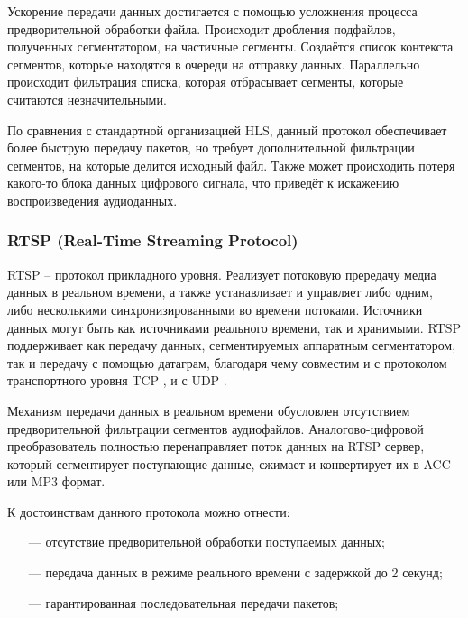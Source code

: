 		\par Ускорение передачи данных достигается с помощью усложнения процесса предворительной обработки файла. 
		Происходит дробления подфайлов, полученных сегментатором, на частичные сегменты. 
		Создаётся список контекста сегментов, которые находятся в очереди на отправку данных.
		Параллельно происходит фильтрация списка, которая отбрасывает сегменты, которые считаются незначительными.

		\par По сравнения с стандартной организацией HLS, данный протокол обеспечивает более быструю передачу пакетов, 
		но требует дополнительной фильтрации сегментов, на которые делится исходный файл. 
		Также может происходить потеря какого-то блока данных цифрового сигнала, что приведёт к искажению воспроизведения аудиоданных.


	\subsubsection{RTSP (Real-Time Streaming Protocol)}

		\par RTSP \cite{rtsp} – протокол прикладного уровня. 
		Реализует потоковую прередачу медиа данных в реальном времени, а также устанавливает и управляет либо одним, либо несколькими синхронизированными во времени потоками.
		Источники данных могут быть как источниками реального времени, так и хранимыми.
		RTSP поддерживает как передачу данных, сегментируемых аппаратным сегментатором, так и передачу с помощью датаграм, благодаря чему совместим и с протоколом транспортного уровня TCP \cite{tcp}, и с UDP \cite{udp}.

		\par Механизм передачи данных в реальном времени обусловлен отсутствием предворительной фильтрации сегментов аудиофайлов. 
		Аналогово-цифровой преобразователь полностью перенаправляет поток данных на RTSP сервер, который сегментирует поступающие данные, 
		сжимает и конвертирует их в ACC или MP3 формат.

		\par К достоинствам данного протокола можно отнести:
		\begin{itemize}[leftmargin=1.6\parindent]
			\item[---] отсутствие предворительной обработки поступаемых данных;
			\item[---] передача данных в режиме реального времени с задержкой до 2 секунд;
			\item[---] гарантированная последовательная передачи пакетов;
		\end{itemize}

